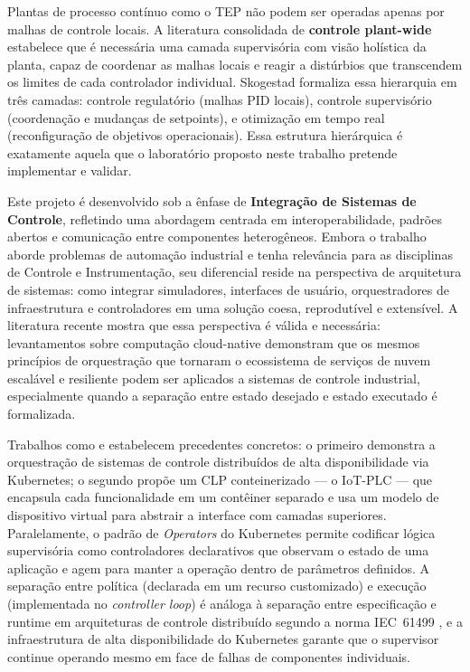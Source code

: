 Plantas de processo contínuo como o TEP não podem ser operadas apenas por malhas de controle locais. A literatura consolidada de \textbf{controle plant-wide} \cite{Larsson2000, Skogestad2004} estabelece que é necessária uma camada supervisória com visão holística da planta, capaz de coordenar as malhas locais e reagir a distúrbios que transcendem os limites de cada controlador individual. Skogestad formaliza essa hierarquia em três camadas: controle regulatório (malhas PID locais), controle supervisório (coordenação e mudanças de setpoints), e otimização em tempo real (reconfiguração de objetivos operacionais). Essa estrutura hierárquica é exatamente aquela que o laboratório proposto neste trabalho pretende implementar e validar.

Este projeto é desenvolvido sob a ênfase de \textbf{Integração de Sistemas de Controle}, refletindo uma abordagem centrada em interoperabilidade, padrões abertos e comunicação entre componentes heterogêneos. Embora o trabalho aborde problemas de automação industrial e tenha relevância para as disciplinas de Controle e Instrumentação, seu diferencial reside na perspectiva de arquitetura de sistemas: como integrar simuladores, interfaces de usuário, orquestradores de infraestrutura e controladores em uma solução coesa, reprodutível e extensível. A literatura recente mostra que essa perspectiva é válida e necessária: levantamentos sobre computação cloud-native \cite{Shuiguang2023} demonstram que os mesmos princípios de orquestração que tornaram o ecossistema de serviços de nuvem escalável e resiliente podem ser aplicados a sistemas de controle industrial, especialmente quando a separação entre estado desejado e estado executado é formalizada.

Trabalhos como  e  estabelecem precedentes concretos: o primeiro demonstra a orquestração de sistemas de controle distribuídos de alta disponibilidade via Kubernetes; o segundo propõe um CLP conteinerizado — o IoT-PLC — que encapsula cada funcionalidade em um contêiner separado e usa um modelo de dispositivo virtual para abstrair a interface com camadas superiores. Paralelamente, o padrão de \textit{Operators} do Kubernetes \cite{Burns2016} permite codificar lógica supervisória como controladores declarativos que observam o estado de uma aplicação e agem para manter a operação dentro de parâmetros definidos. A separação entre política (declarada em um recurso customizado) e execução (implementada no \textit{controller loop}) é análoga à separação entre especificação e runtime em arquiteturas de controle distribuído segundo a norma IEC~61499 \cite{IEC61499}, e a infraestrutura de alta disponibilidade do Kubernetes garante que o supervisor continue operando mesmo em face de falhas de componentes individuais.

